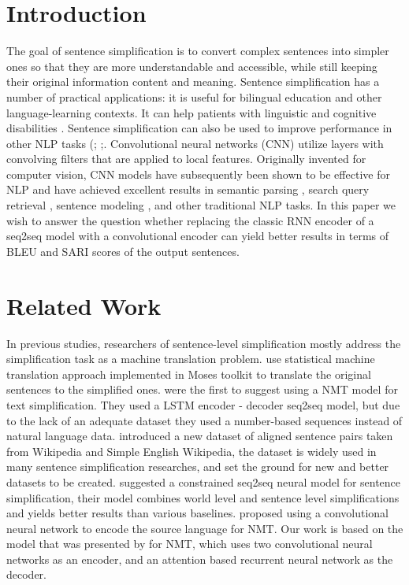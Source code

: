 \documentclass{article}
\begin{document}
\section{Introduction}
\label{Intro}
The goal of sentence simplification is to convert complex sentences into simpler ones so that they are more understandable and accessible, while still keeping their original information content and meaning. Sentence simplification has a number of practical applications: it is useful for bilingual education and other language-learning contexts. It can help patients with linguistic and cognitive disabilities \cite{Carroll99simplifyingtext}. Sentence simplification can also be used to improve performance in other NLP tasks (\cite{niklaus2017sentence}; \cite{Chandrasekar:1996:MMT:993268.993361};\cite{10.1007/978-3-540-30468-5_47}. Convolutional neural networks (CNN) utilize layers with convolving filters that are applied to
local features. Originally invented for computer vision, CNN models have subsequently been shown to be effective for NLP and have achieved excellent results in semantic parsing \cite{yih2014semantic}, search query retrieval \cite{shen2014learning}, sentence modeling \cite{kalchbrenner2014convolutional}, and other traditional NLP tasks.
In this paper we wish to answer the question whether replacing the classic RNN encoder of a seq2seq model with a convolutional encoder can yield better results in terms of BLEU\cite{papineni2002bleu} and SARI\cite{xu2016optimizing} scores of the output sentences.


\section{Related Work}

In previous studies, researchers of sentence-level simplification mostly address the simplification task as a machine translation problem. \cite{10.1007/978-3-642-12320-7_5} use statistical machine translation approach implemented in Moses toolkit \cite{koehn-etal-2007-moses} to translate the original sentences to the simplified ones. \cite{wang2016text} were the first to suggest using a NMT model for text simplification. They used a LSTM encoder - decoder seq2seq model, but due to the lack of an adequate dataset they used a number-based sequences instead of natural language data. \cite{coster-kauchak-2011-simple} introduced a new dataset of aligned sentence pairs taken from Wikipedia and Simple English Wikipedia, the dataset is widely used in many sentence simplification researches, and set the ground for new and better datasets to be created. \cite{DBLP:journals/corr/ZhangYFZY17} suggested a constrained seq2seq neural model for sentence simplification, their model combines world level and sentence level simplifications and yields better results than various baselines. \citep{meng2015encoding} proposed using a convolutional neural network to encode the source language for NMT. Our work is based on the model that was presented by \cite{DBLP:journals/corr/GehringAGD16} for NMT, which uses two convolutional neural networks as an encoder, and an attention based recurrent neural network as the decoder.
\end{document}
